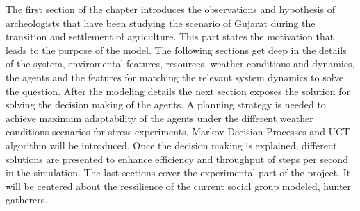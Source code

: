 \documentclass[11pt,oneside,a4paper,openright]{report}
\begin{document}




The first section of the chapter introduces the observations and hypothesis of archeologists that have been studying the scenario of Gujarat during the transition and settlement of agriculture. This part states the motivation that leads to the purpose of the model. The following sections get deep in the details of the system, enviromental features, resources, weather conditions and dynamics, the agents and the features for matching the relevant system dynamics to solve the question. After the modeling details the next section exposes the solution for solving the decision making of the agents. A planning strategy is needed to achieve maximum adaptability of the agents under the different weather conditions scenarios for stress experiments. Markov Decision Processes and UCT algorithm will be introduced. Once the decision making is explained, different solutions are presented to enhance efficiency and throughput of steps per second in the simulation. The last sections cover the experimental part of the project. It will be centered about the ressilience of the current social group modeled, hunter gatherers. %










\end{document}
